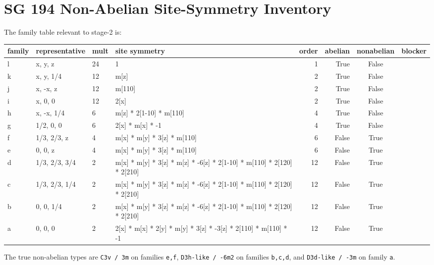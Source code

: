 \documentclass[11pt]{article}
\begin{document}
\section{SG 194 Non-Abelian Site-Symmetry Inventory}
The family table relevant to stage-2 is:
\begin{center}
\begin{longtable}{llllrrcc}
\toprule
family & representative & mult & site symmetry & order & abelian & nonabelian & blocker \\
\midrule
\endhead
l & x, y, z & 24 & 1 & 1 & True & False \\
k & x, y, 1/4 & 12 & m[z] & 2 & True & False \\
j & x, -x, z & 12 & m[110] & 2 & True & False \\
i & x, 0, 0 & 12 & 2[x] & 2 & True & False \\
h & x, -x, 1/4 & 6 & m[z] * 2[1-10] * m[110] & 4 & True & False \\
g & 1/2, 0, 0 & 6 & 2[x] * m[x] * -1 & 4 & True & False \\
f & 1/3, 2/3, z & 4 & m[x] * m[y] * 3[z] * m[110] & 6 & False & True \\
e & 0, 0, z & 4 & m[x] * m[y] * 3[z] * m[110] & 6 & False & True \\
d & 1/3, 2/3, 3/4 & 2 & m[x] * m[y] * 3[z] * m[z] * -6[z] * 2[1-10] * m[110] * 2[120] * 2[210] & 12 & False & True \\
c & 1/3, 2/3, 1/4 & 2 & m[x] * m[y] * 3[z] * m[z] * -6[z] * 2[1-10] * m[110] * 2[120] * 2[210] & 12 & False & True \\
b & 0, 0, 1/4 & 2 & m[x] * m[y] * 3[z] * m[z] * -6[z] * 2[1-10] * m[110] * 2[120] * 2[210] & 12 & False & True \\
a & 0, 0, 0 & 2 & 2[x] * m[x] * 2[y] * m[y] * 3[z] * -3[z] * 2[110] * m[110] * -1 & 12 & False & True \\
\bottomrule
\end{longtable}
\end{center}
The true non-abelian types are \texttt{C3v / 3m} on families \texttt{e,f}, \texttt{D3h-like / -6m2} on families \texttt{b,c,d}, and \texttt{D3d-like / -3m} on family \texttt{a}.
\end{document}
